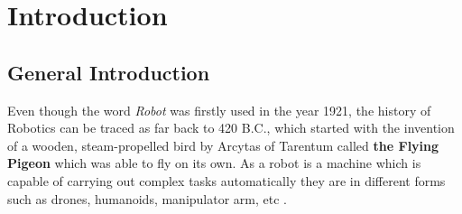 \chapter{Introduction}
\section{General Introduction}
Even though the word \textit{Robot} was firstly used in the year 1921, the history of Robotics can be traced as far back to 420 B.C., which started with the invention of a wooden, steam-propelled bird by Arcytas of Tarentum called \textbf{the Flying Pigeon} which was able to fly on its own.
As a robot is a machine which is capable of carrying out complex tasks automatically they are in different forms such as drones, humanoids, manipulator arm, etc \cite{latombe1991}.

